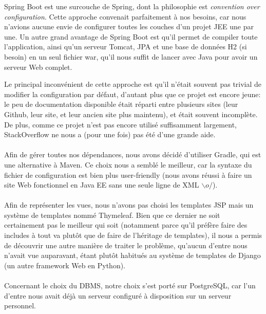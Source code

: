 \documentclass[10pt]{scrartcl}
\begin{document}
  Spring Boot est une surcouche de Spring, dont la philosophie est
  \emph{convention over configuration}. Cette approche convenait
  parfaitement à nos besoins, car nous n'avions aucune envie de
  configurer toutes les couches d'un projet JEE une par une. Un autre
  grand avantage de Spring Boot est qu'il permet de compiler toute
  l'application, ainsi qu'un serveur Tomcat, JPA et une base de
  données H2 (si besoin) en un seul fichier war, qu'il nous suffit de
  lancer avec Java pour avoir un serveur Web complet.

  Le principal inconvénient de cette approche est qu'il n'était
  souvent pas trivial de modifier la configuration par défaut,
  d'autant plus que ce projet est encore jeune: le peu de
  documentation disponible était réparti entre plusieurs sites (leur
  Github, leur site, et leur ancien site plus maintenu), et était
  souvent incomplète. De plus, comme ce projet n'est pas encore
  utilisé suffisamment largement, StackOverflow ne nous a (pour une
  fois) pas été d'une grande aide.

  \paragraph{}
  Afin de gérer toutes nos dépendances, nous avons décidé d'utiliser
  Gradle, qui est une alternative à Maven. Ce choix nous a semblé le
  meilleur, car la syntaxe du fichier de configuration est bien plus
  user-friendly (nous avons réussi à faire un site Web fonctionnel en
  Java EE sans une seule ligne de XML $\backslash o/$).

  \paragraph{}
  Afin de représenter les vues, nous n'avons pas choisi les templates JSP
  mais un système de templates nommé Thymeleaf. Bien que ce dernier
  ne soit certainement pas le meilleur qui soit (notamment parce
  qu'il préfère faire des includes à tout va plutôt que de faire de
  l'héritage de templates), il nous a permis de découvrir une autre
  manière de traiter le problème, qu'aucun d'entre nous n'avait vue
  auparavant, étant plutôt habitués au système de templates de Django
  (un autre framework Web en Python).

  \paragraph{}
  Concernant le choix du DBMS, notre choix s'est porté sur
  PostgreSQL, car l'un d'entre nous avait déjà un serveur configuré à
  disposition sur un serveur personnel.
\end{document}
